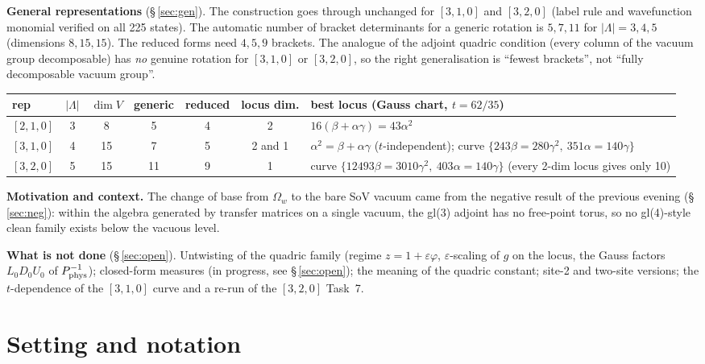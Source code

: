 \documentclass[10pt]{article}
\begin{document}
\textbf{General representations} (\S\,\ref{sec:gen}). The construction goes through unchanged for $[3,1,0]$ and $[3,2,0]$ (label rule and wavefunction monomial verified on all 225 states). The automatic number of bracket determinants for a generic rotation is $5,7,11$ for $|\Lambda|=3,4,5$ (dimensions $8,15,15$). The reduced forms need $4,5,9$ brackets. The analogue of the adjoint quadric condition (every column of the vacuum group decomposable) has \emph{no} genuine rotation for $[3,1,0]$ or $[3,2,0]$, so the right generalisation is ``fewest brackets'', not ``fully decomposable vacuum group''.

\begin{center}\footnotesize\setlength{\tabcolsep}{3pt}\begin{longtable}{@{}p{1.7cm}cccccp{6.2cm}@{}}\toprule
\textbf{rep} & $|\Lambda|$ & $\dim V$ & \textbf{generic} & \textbf{reduced} & \textbf{locus dim.} & \textbf{best locus (Gauss chart, $t=62/35$)} \\\midrule\endhead
$[2,1,0]$ & 3 & 8 & 5 & 4 & 2 & $16(\beta+\alpha\gamma)=43\alpha^2$ \\
$[3,1,0]$ & 4 & 15 & 7 & 5 & 2 and 1 & $\alpha^2=\beta+\alpha\gamma$ ($t$-independent); curve $\{243\beta=280\gamma^2,\ 351\alpha=140\gamma\}$ \\
$[3,2,0]$ & 5 & 15 & 11 & 9 & 1 & curve $\{12493\beta=3010\gamma^2,\ 403\alpha=140\gamma\}$ (every 2-dim locus gives only 10) \\
\bottomrule\end{longtable}\end{center}

\textbf{Motivation and context.} The change of base from $\Omega_w$ to the bare SoV vacuum came from the negative result of the previous evening (\S\,\ref{sec:neg}): within the algebra generated by transfer matrices on a single vacuum, the gl(3) adjoint has no free-point torus, so no gl(4)-style clean family exists below the vacuous level.

\textbf{What is not done} (\S\,\ref{sec:open}). Untwisting of the quadric family (regime $z=1+\varepsilon\varphi$, $\varepsilon$-scaling of $g$ on the locus, the Gauss factors $L_0D_0U_0$ of $P_{\rm phys}^{-1}$); closed-form measures (in progress, see \S\,\ref{sec:open}); the meaning of the quadric constant; site-2 and two-site versions; the $t$-dependence of the $[3,1,0]$ curve and a re-run of the $[3,2,0]$ Task~7.

\section{Setting and notation}\label{sec:setting}
\end{document}
